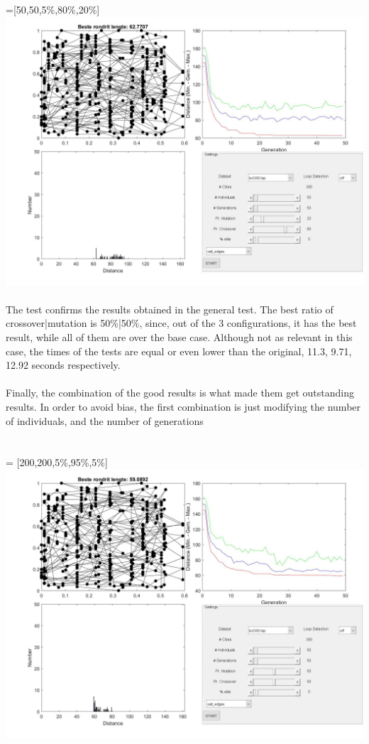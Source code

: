  =[50,50,5\%,80\%,20\%] \\
\includegraphics[width=\textwidth]{img/specific/xalt_edges/general_8.jpg}\\
\\
The test confirms the results obtained in the general test. The best ratio of
crossover|mutation is 50\%|50\%, since, out of the 3 configurations, it has the
best result, while all of them are over the base case. Although not as relevant
in this case, the times of the tests are equal or even lower than the original, 11.3,
9.71, 12.92 seconds respectively. \\
\\
Finally, the combination of the good results is what made them get
outstanding results. In order to avoid bias, the first combination is just
modifying the number of individuals, and the number of generations\\
\\
\\
 = [200,200,5\%,95\%,5\%] \\
\includegraphics[width=\textwidth]{img/specific/xalt_edges/general_6.jpg}\\
